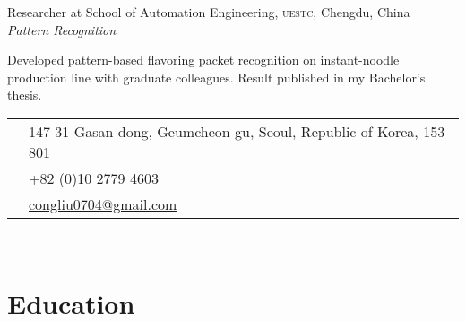 \documentclass[10pt]{article} %
\begin{document}
{\begin{minipage}[t]{0.5\textwidth}
{\raggedright\large Researcher at School of Automation Engineering, \textsc{uestc}, Chengdu, China\\
\textit{Pattern Recognition}\\[5pt]}

\normalsize{Developed pattern-based flavoring packet recognition on instant-noodle production line with graduate colleagues. Result published in my Bachelor's thesis.}\\


\end{minipage} %
\hfill
\begin{minipage}[t]{0.44\textwidth} %
\vspace{0pt} %


\colorbox{shade}{\textcolor{textcolor}{
\begin{tabular}{c|p{7cm}}
\raisebox{-4pt}{\textifsymbol{18}} & 147-31 Gasan-dong, Geumcheon-gu, Seoul, Republic of Korea, 153-801 \\ %
\raisebox{-3pt}{\Mobilefone} & +82 (0)10 2779 4603 \\ %
\raisebox{-1pt}{\Letter} & \href{mailto:john@smith.com}{congliu0704@gmail.com}\\ %
\end{tabular}
}
}\\[10pt]


\section{Education} 

\begin{tabular}{rl} %


\end{tabular}
\end{minipage}}
\end{document}
